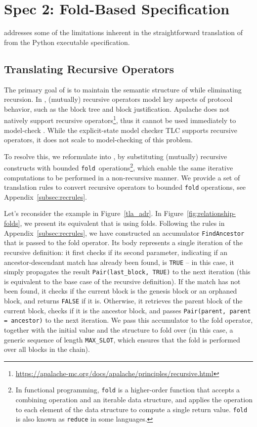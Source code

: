 
\section{Spec 2: Fold-Based Specification}\label{sec:spec2}

\SpecTwo{} addresses some of the limitations inherent in the straightforward
translation of \SpecOne{} from the Python executable specification.

\subsection{Translating Recursive \tlap{} Operators}

The primary goal of \SpecTwo{} is to maintain the semantic structure of
\SpecOne{} while eliminating recursion. In \SpecOne{}, (mutually) recursive
operators model key aspects of protocol behavior, such as the block tree and
block justification. Apalache does not natively support recursive
operators\footnote{\url{https://apalache-mc.org/docs/apalache/principles/recursive.html}},
thus it cannot be used immediately to model-check \SpecOne{}. While the
explicit-state \tlap{} model checker TLC supports recursive operators, it does
not scale to model-checking of this problem.

To resolve this, we reformulate \SpecOne{} into \SpecTwo{}, by substituting
(mutually) recursive constructs with bounded
\texttt{fold}~operations\footnote{In functional programming, \texttt{fold} is a
higher-order function that accepts a combining operation and an iterable data
structure, and applies the operation to each element of the data structure
to compute a single return value. \texttt{fold} is also known as
\texttt{reduce} in some languages.}, which enable the same iterative
computations to be performed in a non-recursive manner. We provide a set of
translation rules to convert recursive operators to bounded \texttt{fold}
operations, see Appendix~\ref{subsec:recrules}.

Let's reconsider the example in Figure~\ref{tla_adr}. In
Figure~\ref{fig:relationship-folds}, we present its equivalent that is using
folds. Following the rules in Appendix~\ref{subsec:recrules}, we have
constructed an accumulator \texttt{FindAncestor} that is passed to the fold
operator. Its body represents a single iteration of the recursive definition: it
first checks if its second parameter, indicating if an ancestor-descendant match
has already been found, is \texttt{TRUE} -- in this case, it simply propagates
the result \texttt{Pair(last\_block, TRUE)} to the next iteration (this is
equivalent to the base case of the recursive definition). If the match has not
been found, it checks if the current block is the genesis block or an orphaned
block, and returns \texttt{FALSE} if it is. Otherwise, it retrieves the parent
block of the current block, checks if it is the ancestor block, and passes
\texttt{Pair(parent, parent = ancestor)} to the next iteration. We pass this
accumulator to the fold operator, together with the initial value and the
structure to fold over (in this case, a generic sequence of length
\texttt{MAX\_SLOT}, which ensures that the fold is performed over all blocks in
the chain).


